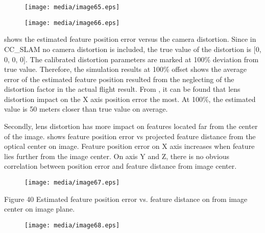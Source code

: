 \begin{figure}[h]
\centering
\texttt{[image: media/image65.eps]}
\end{figure}


\begin{figure}[h]
\centering
\texttt{[image: media/image66.eps]}
\caption{\label{figure:_Ref349768778}}
\end{figure}



 shows the estimated feature position error versus the camera distortion. 
Since in CC\_SLAM no camera distortion is included, the true value of 
the distortion is $[$0, 0, 0, 0$]$. The calibrated distortion parameters 
are marked at 100\% deviation from true value. Therefore, the simulation 
results at 100\% offset shows the average error of the estimated feature 
position resulted from the neglecting of the distortion factor in the 
actual flight result. From , it can be found that lens distortion impact 
on the X axis position error the most. At 100\%, the estimated value is 
50 meters closer than true value on average. 

Secondly, lens distortion has more impact on features located far from 
the center of the image. shows feature position error vs projected 
feature distance from the optical center on image. Feature position 
error on X axis increases when feature lies further from the image 
center. On axis Y and Z, there is no obvious correlation between 
position error and feature distance from image center. 

\begin{figure}[h]
\centering
\texttt{[image: media/image67.eps]}
\end{figure}


Figure 40 Estimated feature position error vs. feature distance on from 
image center on image plane. 

 

\begin{figure}[h]
\centering
\texttt{[image: media/image68.eps]}
\end{figure}
